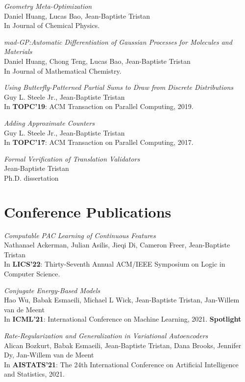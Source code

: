 \documentclass[margin,line]{res}
\begin{document}
\begin{resume}
\emph{Geometry Meta-Optimization}\\
Daniel Huang, Lucas Bao, Jean-Baptiste Tristan\\
In Journal of Chemical Physics.

\emph{mad-GP:Automatic Differentiation of Gaussian Processes for Molecules and Materials}\\
Daniel Huang, Chong Teng, Lucas Bao, Jean-Baptiste Tristan\\
In Journal of Mathematical Chemistry.

\emph{Using Butterfly-Patterned Partial Sums to Draw from Discrete Distributions}\\
Guy L. Steele Jr., Jean-Baptiste Tristan\\
In {\bf TOPC'19}: ACM Transaction on Parallel Computing, 2019.

\emph{Adding Approximate Counters}\\
Guy L. Steele Jr., Jean-Baptiste Tristan\\
In {\bf TOPC'17}: ACM Transaction on Parallel Computing, 2017.

\emph{Formal Verification of Translation Validators}\\
Jean-Baptiste Tristan\\
Ph.D. dissertation

\section{\sc Conference Publications}

\emph{Computable PAC Learning of Continuous Features}\\
Nathanael Ackerman, Julian Asilis, Jieqi Di, Cameron Freer, Jean-Baptiste Tristan\\
In {\bf LICS'22}: Thirty-Seventh Annual ACM/IEEE Symposium on
Logic in Computer Science.

\emph{Conjugate Energy-Based Models}\\
Hao Wu, Babak Esmaeili, Michael L Wick, Jean-Baptiste Tristan, Jan-Willem van de Meent\\
In {\bf ICML'21}: International Conference on Machine Learning, 2021. {\bf Spotlight}

\emph{Rate-Regularization and Generalization in Variational Autoencoders}\\
Alican Bozkurt, Babak Esmaeili, Jean-Baptiste Tristan, Dana Brooks, Jennifer Dy, Jan-Willem van de Meent\\
In {\bf AISTATS'21}: The 24th International Conference on
Artificial Intelligence and Statistics, 2021.


\end{resume}
\end{document}
